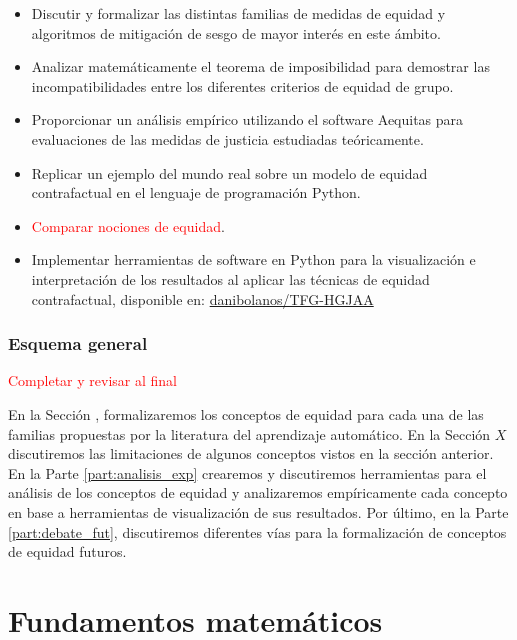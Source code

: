 \documentclass[oneside,openright,titlepage,numbers=noenddot,openany,headinclude,footinclude=true,
cleardoublepage=empty,abstractoff,BCOR=5mm,paper=a4,fontsize=12pt,main=spanish]{scrreprt}
\begin{document}
\begin{itemize}
    \item Discutir y formalizar las distintas familias de medidas de equidad y algoritmos de mitigación de sesgo de mayor interés en este ámbito.
    \item Analizar matemáticamente el teorema de imposibilidad para demostrar las incompatibilidades entre los diferentes criterios de equidad de grupo.
    \item Proporcionar un análisis empírico utilizando el software Aequitas para evaluaciones de las medidas de justicia estudiadas teóricamente.
    \item Replicar un ejemplo del mundo real sobre un modelo de equidad contrafactual en el lenguaje de programación Python.
    \item \textcolor{red}{Comparar nociones de equidad}.
    \item Implementar herramientas de software en Python para la visualización e interpretación de los resultados al aplicar las técnicas de equidad contrafactual, disponible en: \href{https://github.com/danibolanos/TFG-HGJAA.git}{danibolanos/TFG-HGJAA}
\end{itemize}

\section{Esquema general}

\textcolor{red}{Completar y revisar al final}

En la Sección , formalizaremos los conceptos de equidad para cada una de las familias propuestas por la literatura del aprendizaje automático. En la Sección $X$ discutiremos las limitaciones de algunos conceptos vistos en la sección anterior. En la Parte \ref{part:analisis_exp} crearemos y discutiremos herramientas para el análisis de los conceptos de equidad y analizaremos empíricamente cada concepto en base a herramientas de visualización de sus resultados. Por último, en la Parte \ref{part:debate_fut}, discutiremos diferentes vías para la formalización de conceptos de equidad futuros.

\part{Fundamentos matemáticos}
\end{document}
